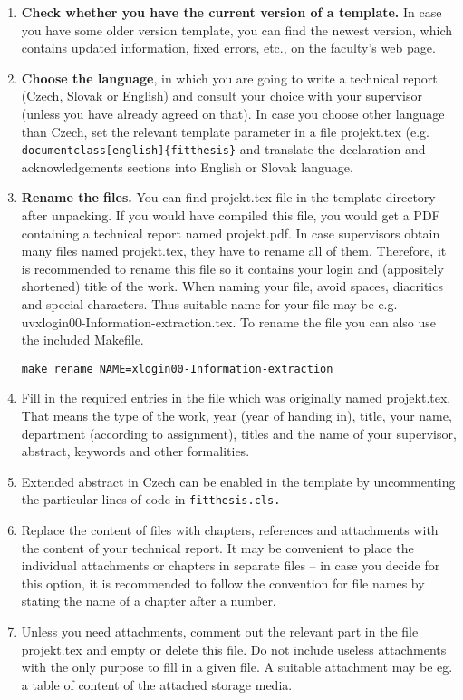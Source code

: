 \begin{enumerate}
  \item \textbf{Check whether you have the current version of a template.} In case you have some older version template, you can find the newest version, which contains updated information, fixed errors, etc., on the faculty's web page.
  \item \textbf{Choose the language}, in which you are going to write a technical report (Czech, Slovak or English) and consult your choice with your supervisor (unless you have already agreed on that). In case you choose other language than Czech, set the relevant template parameter in a file projekt.tex (e.g. \verb|documentclass[english]{fitthesis}| and translate the declaration and acknowledgements sections into English or Slovak language.
  \item \textbf{Rename the files.} You can find projekt.tex file in the template directory after unpacking. If you would have compiled this file, you would get a PDF containing a technical report named projekt.pdf. In case supervisors obtain many files named projekt.tex, they have to rename all of them. Therefore, it is recommended to rename this file so it contains your login and (appositely shortened) title of the work. When naming your file, avoid spaces, diacritics and special characters. Thus suitable name for your file may be e.g. uv{xlogin00-Information-extraction.tex}. To rename the file you can also use the included Makefile.
\begin{verbatim}
make rename NAME=xlogin00-Information-extraction
\end{verbatim}
  \item Fill in the required entries in the file which was originally named projekt.tex. That means the type of the work, year (year of handing in), title, your name, department (according to assignment), titles and the name of your supervisor, abstract, keywords and other formalities.
  \item Extended abstract in Czech can be enabled in the template by uncommenting the particular lines of code in \tt fitthesis.cls\rm .
  \item Replace the content of files with chapters, references and attachments with the content of your technical report. It may be convenient to place the individual attachments or chapters in separate files -- in case you decide for this option, it is recommended to follow the convention for file names by stating the name of a chapter after a number.
  \item Unless you need attachments, comment out the relevant part in the file projekt.tex and empty or delete this file. Do not include useless attachments with the only purpose to fill in a given file. A suitable attachment may be eg. a table of content of the attached storage media.

\end{enumerate}
